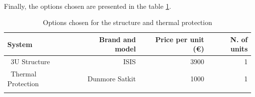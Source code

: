 \paragraph{}Finally, the options chosen are presented in the table \ref{structurefinal}.

\begin{longtable}{| l | r | r | r | }
\hline
\rowcolor[gray]{0.80}	\textbf{System} &  \textbf{Brand and model}     & \textbf{Price per unit (\euro)} & \textbf{N. of units}  \\
\hline
\endfirsthead

	   ~3U Structure & ISIS & 3900 & 1 \\
	   \hline
	   ~Thermal Protection & Dunmore Satkit & 1000 & 1\\
	\hline

\caption{Options chosen for the structure and thermal protection}
\label{structurefinal}
\end{longtable}
